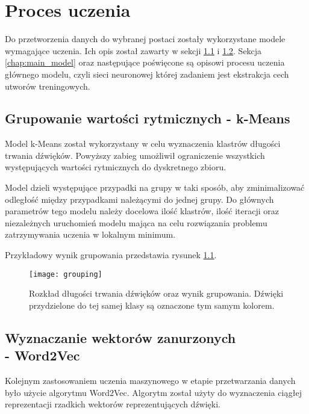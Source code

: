 \chapter{Proces uczenia} 
{
    Do przetworzenia danych do wybranej postaci zostały wykorzystane modele wymagające uczenia.
    Ich opis został zawarty w sekcji \ref{chap:models_data_k} i\,\,\ref{chap:models_data_v}. Sekcja \ref{chap:main_model} oraz następujące
    poświęcone są opisowi procesu uczenia głównego modelu, czyli sieci neuronowej której 
    zadaniem jest ekstrakcja cech utworów treningowych.

    \section{Grupowanie wartości rytmicznych - k-Means}\label{chap:models_data_k}
    {
        Model k-Means został wykorzystany w\,\,celu wyznaczenia klastrów
        długości trwania dźwięków. Powyższy zabieg umożliwił ograniczenie wszystkich występujących 
        wartości rytmicznych do dyskretnego zbioru. 
        
        Model dzieli występujące przypadki na grupy w taki sposób, aby zminimalizować odległość 
        między przypadkami należącymi do jednej grupy.
        Do głównych parametrów tego modelu należy docelowa ilość klastrów, ilość iteracji
        oraz niezależnych uruchomień modelu mająca na celu rozwiązania problemu zatrzymywania uczenia w\,\,lokalnym minimum.

        Przykładowy wynik grupowania przedstawia rysunek \ref{grouping}.

        \begin{figure}[H]
            \centering
            \texttt{[image: grouping]}
            \caption{Rozkład długości trwania dźwięków oraz wynik grupowania. Dźwięki przydzielone do tej samej klasy są oznaczone tym samym kolorem.}
            \label{grouping}
        \end{figure}
    }

    \section{Wyznaczanie wektorów zanurzonych \\ - Word2Vec}\label{chap:models_data_v}
    {
        Kolejnym zastosowaniem uczenia maszynowego w\,\,etapie przetwarzania danych było użycie algorytmu Word2Vec. Algorytm 
        został użyty do wyznaczenia ciągłej reprezentacji rzadkich wektorów reprezentujących dźwięki.
        
}}
